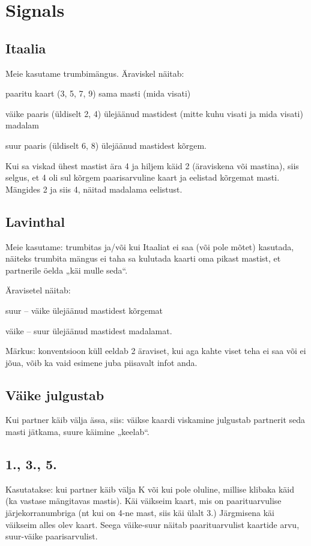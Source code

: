 \documentclass[10pt]{article}
\begin{document}
\newpage
\section{Signals}
\subsection{Itaalia}

Meie kasutame trumbimängus.
Äraviskel näitab:

paaritu kaart (3, 5, 7, 9)	 sama masti (mida visati)

väike paaris (üldiselt 2, 4)	 ülejäänud mastidest (mitte kuhu visati ja mida visati) madalam

suur paaris (üldiselt 6, 8)	 ülejäänud mastidest kõrgem.

Kui sa viskad ühest mastist ära 4 ja hiljem käid 2 (äraviskena või mastina),
siis selgus, et 4 oli sul kõrgem paarisarvuline kaart ja eelistad kõrgemat
masti. Mängides 2 ja siis 4, näitad madalama eelistust.

\subsection{Lavinthal}

Meie kasutame: trumbitas ja/või kui Itaaliat ei saa (või pole mõtet) kasutada, näiteks trumbita mängus ei taha sa kulutada kaarti oma pikast mastist, et partnerile öelda „käi mulle seda“.

Äravisetel näitab:

suur – väike ülejäänud mastidest kõrgemat

väike – suur ülejäänud mastidest madalamat.

Märkus: konventsioon küll eeldab 2 äraviset, kui aga kahte viset teha ei saa või ei jõua, võib ka vaid esimene juba piisavalt infot anda.

\subsection{Väike julgustab}

Kui partner käib välja ässa, siis: väikse kaardi viskamine julgustab partnerit seda masti jätkama, suure käimine „keelab“.

\subsection{1., 3., 5.}

Kasutatakse: kui partner käib välja K või kui pole oluline, millise klibaka käid (ka vastase mängitavas mastis). Käi väikseim kaart, mis on paarituarvulise järjekorranumbriga (nt kui on 4-ne mast, siis käi ülalt 3.) Järgmisena käi väikseim alles olev kaart. Seega väike-suur näitab paarituarvulist kaartide arvu, suur-väike paarisarvulist.
\end{document}
